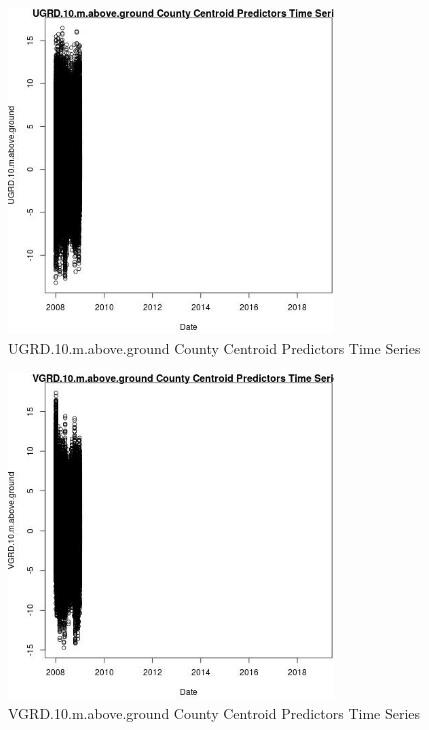 \begin{figure} 
\centering  
\includegraphics[width=0.77\textwidth]{Code_Outputs/df_report_ML_predictors_CountyCentroid_Locations_Dates_2008-01-01to2018-12-31_UGRD10mabovegroundvDate.jpg} 
\caption{\label{fig:df_report_ML_predictors_CountyCentroid_Locations_Dates_2008-01-01to2018-12-31UGRD10mabovegroundvDate}UGRD.10.m.above.ground County Centroid Predictors Time Series} 
\end{figure} 
 

\begin{figure} 
\centering  
\includegraphics[width=0.77\textwidth]{Code_Outputs/df_report_ML_predictors_CountyCentroid_Locations_Dates_2008-01-01to2018-12-31_VGRD10mabovegroundvDate.jpg} 
\caption{\label{fig:df_report_ML_predictors_CountyCentroid_Locations_Dates_2008-01-01to2018-12-31VGRD10mabovegroundvDate}VGRD.10.m.above.ground County Centroid Predictors Time Series} 
\end{figure} 
 

